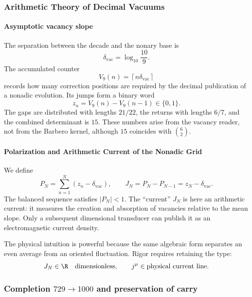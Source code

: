 \subsubsection{Arithmetic Theory of Decimal Vacuums}

\paragraph{Asymptotic vacancy slope}

The separation between the decade and the nonary base is
\begin{equation}
\delta_{\mathrm{vac}}=\log_{10}\frac{10}{9}.
\label{eq:delta-vac}
\end{equation}
The accumulated counter
\begin{equation}
V_9(n)=\left\lceil n\delta_{\mathrm{vac}}\right\rceil
\label{eq:vacancy-count}
\end{equation}
records how many correction positions are required by the decimal publication of
a nonadic evolution. Its jumps form a binary word
\[
z_n=V_9(n)-V_9(n-1)\in\{0,1\}.
\]
The gaps are distributed with lengths \(21/22\), the returns with
lengths \(6/7\), and the combined determinant is \(15\). These numbers
arise from the vacancy reader, not from the Barbero kernel, although \(15\)
coincides with \(\binom62\).

\paragraph{Polarization and Arithmetic Current of the Nonadic Grid}

We define
\begin{equation}
P_N=\sum_{n=1}^N(z_n-\delta_{\mathrm{vac}}),
\qquad
J_N=P_N-P_{N-1}=z_N-\delta_{\mathrm{vac}}.
\label{eq:arith-current}
\end{equation}
The balanced sequence satisfies \(|P_N|<1\). The \enquote{current}
\(J_N\) is here an arithmetic current: it measures the creation and absorption of
vacancies relative to the mean slope. Only a subsequent dimensional transducer
can publish it as an electromagnetic current density.

The physical intuition is powerful because the same algebraic form separates an
even average from an oriented fluctuation. Rigor requires retaining the type:
\[
J_N\in\R\quad\text{dimensionless},
\qquad
j^\mu\in\text{physical current line}.
\]

\subsubsection{Completion \(729\to1000\) and preservation of carry}


